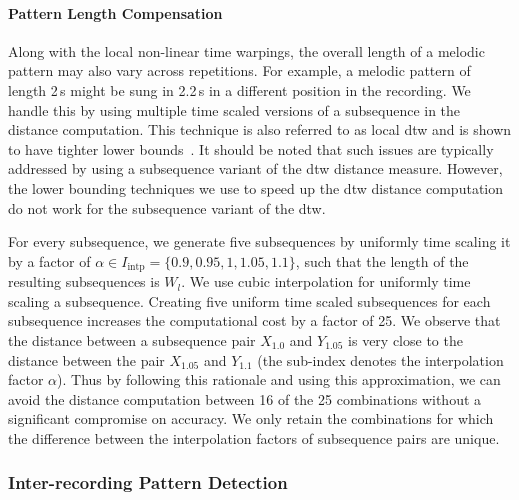 \paragraph{Pattern Length Compensation}
\label{PatternLengthCompensation}

Along with the local non-linear time warpings, the overall length of a melodic pattern may also vary across repetitions. For example, a melodic pattern of length 2\,s might be sung in 2.2\,s in a different position in the recording. We handle this by using multiple time scaled versions of a subsequence in the distance computation. This technique is also referred to as local \gls{dtw} and is shown to have tighter lower bounds~\citep{Zhu2003}. It should be noted that such issues are typically addressed by using a subsequence variant of the \gls{dtw} distance measure. However, the lower bounding techniques we use to speed up the \gls{dtw} distance computation do not work for the subsequence variant of the \gls{dtw}. 

For every subsequence, we generate five subsequences by uniformly time scaling it by a factor of $\alpha \in I_{\text{intp}} =\lbrace 0.9, 0.95, 1, 1.05, 1.1\rbrace$, such that the length of the resulting subsequences is $W_l$. We use cubic interpolation for uniformly time scaling a subsequence. Creating five uniform time scaled subsequences for each subsequence increases the computational cost by a factor of 25. We observe that the distance between a subsequence pair $X_{1.0}$ and $Y_{1.05}$ is very close to the distance between the pair $X_{1.05}$ and $Y_{1.1}$ (the sub-index denotes the interpolation factor $\alpha$). Thus by following this rationale and using this approximation, we can avoid the distance computation between 16 of the 25 combinations without a significant compromise on accuracy. We only retain the combinations for which the difference between the interpolation factors of subsequence pairs are unique. 

\subsubsection{Inter-recording Pattern Detection}
\label{sec:inter_recording_pattern_search}

